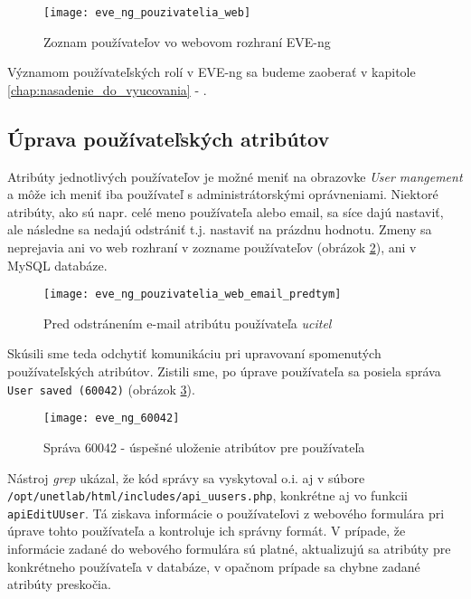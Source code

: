 \begin{figure}
    \centering
    \texttt{[image: eve\_ng\_pouzivatelia\_web]}
    \caption{Zoznam používateľov vo webovom rozhraní EVE-ng}
    \label{obr:eve_ng_pouzivatelia_web}
\end{figure}

Významom používateľských rolí v EVE-ng sa budeme zaoberať v kapitole \ref{chap:nasadenie_do_vyucovania} - .




\subsection{Úprava používateľských atribútov}

Atribúty jednotlivých používateľov je možné meniť na obrazovke \emph{User mangement} a môže ich meniť iba používateľ s administrátorskými oprávneniami. Niektoré atribúty, ako sú napr. celé meno používateľa alebo email, sa síce dajú nastaviť, ale následne sa nedajú odstrániť t.j. nastaviť na prázdnu hodnotu. Zmeny sa neprejavia ani vo web rozhraní v zozname používateľov (obrázok \ref{obr:eve_ng_pouzivatelia_web_email_predtym}), ani v MySQL databáze.

\begin{figure}
    \centering
    \texttt{[image: eve\_ng\_pouzivatelia\_web\_email\_predtym]}
    \caption{Pred odstránením e-mail atribútu používateľa \emph{ucitel}}
    \label{obr:eve_ng_pouzivatelia_web_email_predtym}
\end{figure}

Skúsili sme teda odchytiť komunikáciu pri upravovaní spomenutých používateľských atribútov. Zistili sme, po úprave používateľa sa posiela správa \texttt{User saved (60042)} (obrázok \ref{obr:eve_ng_60042}).

\begin{figure}
    \centering
    \texttt{[image: eve\_ng\_60042]}
    \caption{Správa 60042 - úspešné uloženie atribútov pre používateľa}
    \label{obr:eve_ng_60042}
\end{figure}

Nástroj \emph{grep} ukázal, že kód správy sa vyskytoval o.i. aj v súbore \\
\texttt{/opt/unetlab/html/includes/api\_uusers.php}, konkrétne aj vo funkcii \texttt{apiEditUUser}. Tá ziskava informácie o používateľovi z webového formulára pri úprave tohto používateľa a kontroluje ich správny formát. V prípade, že informácie zadané do webového formulára sú platné, aktualizujú sa atribúty pre konkrétneho používateľa v databáze, v opačnom prípade sa chybne zadané atribúty preskočia.

